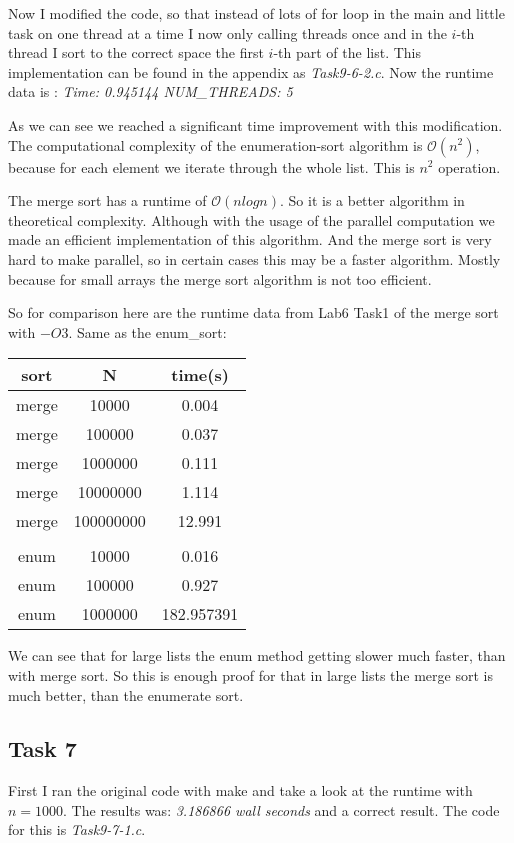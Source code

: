 Now I modified the code, so that instead of lots of for loop in the main and little task on one thread at a time I now only calling threads once and in the $i$-th thread I sort to the correct space the first $i$-th part of the list. This implementation can be found in the appendix as \textit{Task9-6-2.c}. Now the runtime data is : \textit{Time: 0.945144 NUM\_THREADS: 5}

As we can see we reached a significant time improvement with this modification. The computational complexity of the enumeration-sort algorithm is $\mathcal{O}(n^2)$, because for each element we iterate through the whole list. This is $n^2$ operation.

The merge sort has a runtime of $\mathcal{O}(n log n)$. So it is a better algorithm in theoretical complexity. Although with the usage of the parallel computation we made an efficient implementation of this algorithm. And the merge sort is very hard to make parallel, so in certain cases this may be a faster algorithm. Mostly because for small arrays the merge sort algorithm is not too efficient.

So for comparison here are the runtime data from Lab6 Task1 of the merge sort with $-O3$. Same as the enum\_sort:

\begin{tabular}{c|c|c}
sort & N & time(s)\\ \hline
merge &10000& 0.004\\
merge & 100000& 0.037\\
merge & 1000000 & 0.111\\
merge & 10000000 &1.114\\
merge & 100000000 &12.991\\
& & \\
enum & 	10000 & 0.016\\
enum & 	100000 & 0.927\\
enum & 	1000000 & 182.957391\\
\end{tabular}

We can see that for large lists the enum method getting slower much faster, than with merge sort. So this is enough proof for that in large lists the merge sort is much better, than the enumerate sort. 


\subsection*{Task 7}
First I ran the original code with make and take a look at the runtime with $n=1000$. The results was: \textit{3.186866 wall seconds} and a correct result. The code for this is \textit{Task9-7-1.c}.


